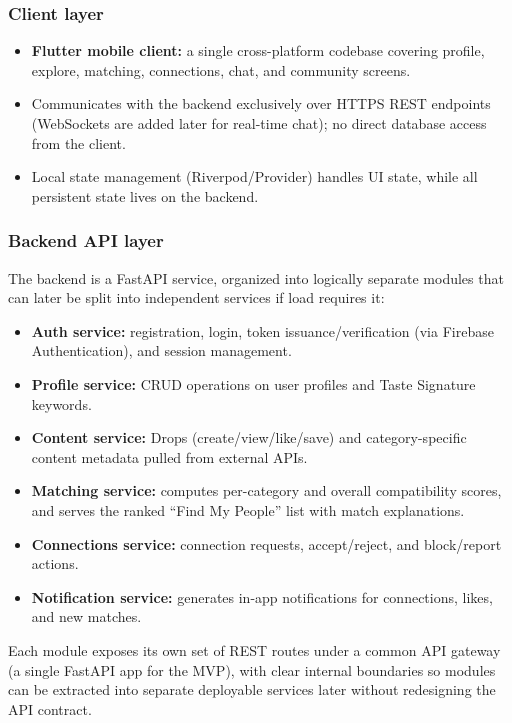 \documentclass[11pt,a4paper]{article}
\begin{document}
\subsubsection*{Client layer}
\begin{itemize}[leftmargin=0.7cm]
    \item \textbf{Flutter mobile client:} a single cross-platform codebase covering profile, explore, matching, connections, chat, and community screens.
    \item Communicates with the backend exclusively over HTTPS REST endpoints (WebSockets are added later for real-time chat); no direct database access from the client.
    \item Local state management (Riverpod/Provider) handles UI state, while all persistent state lives on the backend.
\end{itemize}

\subsubsection*{Backend API layer}
The backend is a FastAPI service, organized into logically separate modules that can later be
split into independent services if load requires it:
\begin{itemize}[leftmargin=0.7cm]
    \item \textbf{Auth service:} registration, login, token issuance/verification (via Firebase Authentication), and session management.
    \item \textbf{Profile service:} CRUD operations on user profiles and Taste Signature keywords.
    \item \textbf{Content service:} Drops (create/view/like/save) and category-specific content metadata pulled from external APIs.
    \item \textbf{Matching service:} computes per-category and overall compatibility scores, and serves the ranked ``Find My People'' list with match explanations.
    \item \textbf{Connections service:} connection requests, accept/reject, and block/report actions.
    \item \textbf{Notification service:} generates in-app notifications for connections, likes, and new matches.
\end{itemize}
Each module exposes its own set of REST routes under a common API gateway (a single FastAPI app
for the MVP), with clear internal boundaries so modules can be extracted into separate deployable
services later without redesigning the API contract.
\end{document}
